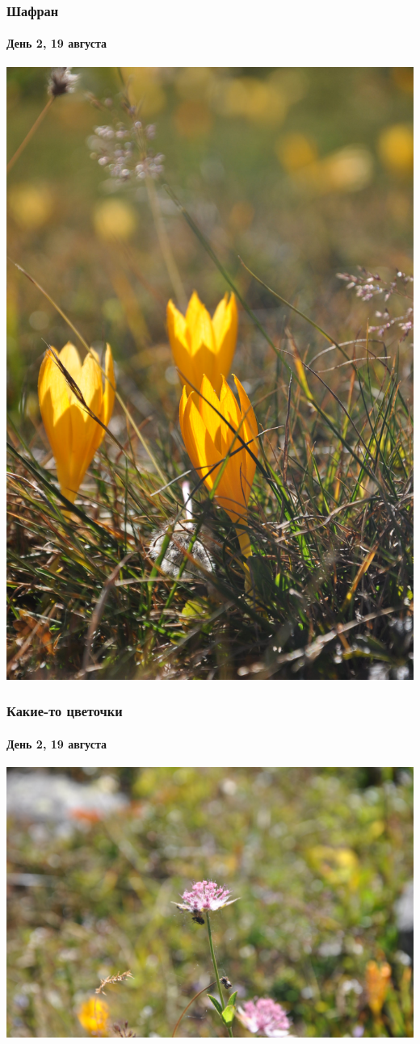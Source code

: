 \begin{frame}
	\frametitle{Шафран}
	\framesubtitle{День 2, 19 августа}
	\centering
	\includegraphics[width=\linewidth]{../pics/DSC_0725}
	\end{frame}

\begin{frame}
	\frametitle{Какие-то цветочки}
	\framesubtitle{День 2, 19 августа}
	\centering
	\includegraphics[width=\linewidth]{../pics/DSC_0732}
\end{frame}

